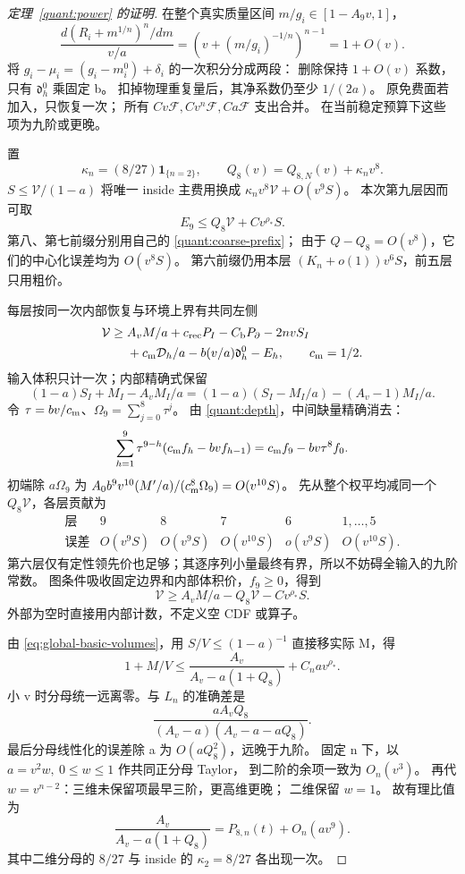 \begin{proof}[定理~\ref{quant:power} 的证明]
在整个真实质量区间 \(m/g_i\in[1-A_9v,1]\)，
\[
 \frac{d(R_i+m^{1/n})^n/dm}{v/a}
              =(v+(m/g_i)^{-1/n})^{n-1}=1+O(v).
\]
将 \(g_i-\mu_i=(g_i-m_i^0)+\delta_i\) 的一次积分分成两段：
删除保持 \(1+O(v)\) 系数，只有 \(\mathfrak d_h^0\) 乘固定 b。
扣掉物理重复量后，其净系数仍至少 \(1/(2a)\)。
原免费面若加入，只恢复一次；
所有 \(Cv\mathcal F,Cv^n\mathcal F,Ca\mathcal F\) 支出合并。
在当前稳定预算下这些项为九阶或更晚。

置
\[
 \kappa_n=(8/27)\mathbf1_{\{n=2\}},\qquad
 Q_8(v)=Q_{8,N}(v)+\kappa_nv^8.
\]
\(S\le\mathcal V/(1-a)\) 将唯一 inside 主费用换成
\(\kappa_nv^8\mathcal V+O(v^9S)\)。
本次第九层因而可取
\[
 E_9\le Q_8\mathcal V+Cv^{\rho_*}S.
\]
第八、第七前缀分别用自己的
\eqref{quant:coarse-prefix}；
由于 \(Q-Q_8=O(v^8)\)，它们的中心化误差均为 \(O(v^8S)\)。
第六前缀仍用本层 \((K_n+o(1))v^6S\)，前五层只用粗价。

每层按同一次内部恢复与环境上界有共同左侧
\[
 \begin{aligned}
 \mathcal V\ge{}&A_vM/a+c_{\rm rec}P_I-C_{\rm b}P_\partial-2nvS_I\\
 &+c_{\rm m}\mathcal D_h/a-b(v/a)\mathfrak d_h^0-E_h,
 \qquad c_{\rm m}=1/2 .
 \end{aligned}
\]
输入体积只计一次；内部精确式保留
\[
 (1-a)S_I+M_I-A_vM_I/a
 =(1-a)(S_I-M_I/a)-(A_v-1)M_I/a .
\]
令 \(\tau=bv/c_{\rm m}\)、\(\Omega_9=\sum_{j=0}^8\tau^j\)。
由 \eqref{quant:depth}，中间缺量精确消去：
\[
 \sum_{h=1}^9\tau^{9-h}(c_{\rm m}f_h-bvf_{h-1})
       =c_{\rm m}f_9-bv\tau^8f_0 .
\]
初端除 \(a\Omega_9\) 为
\(A_0b^9v^{10}(M'/a)/(c_{\rm m}^8\Omega_9)=O(v^{10}S)\)。
先从整个权平均减同一个 \(Q_8\mathcal V\)，各层贡献为
\[
 \begin{array}{c|ccccc}
  \text{层}&9&8&7&6&1,\ldots,5\\ \hline
  \text{误差}&O(v^9S)&O(v^9S)&O(v^{10}S)&o(v^9S)&O(v^{10}S).
 \end{array}
\]
第六层仅有定性领先价也足够；其逐序列小量最终有界，所以不妨碍全输入的九阶常数。
图条件吸收固定边界和内部体积价，\(f_9\ge0\)，得到
\[
 \mathcal V\ge A_vM/a-Q_8\mathcal V-Cv^{\rho_*}S.
\]
外部为空时直接用内部计数，不定义空 CDF 或算子。

由 \eqref{eq:global-basic-volumes}，用 \(S/V\le(1-a)^{-1}\) 直接移实际 M，得
\[
 1+M/V\le\frac{A_v}{A_v-a(1+Q_8)}+C_n av^{\rho_*}.
\]
小 v 时分母统一远离零。与 \(L_n\) 的准确差是
\[
 \frac{aA_vQ_8}{(A_v-a)(A_v-a-aQ_8)}.
\]
最后分母线性化的误差除 a 为 \(O(aQ_8^2)\)，远晚于九阶。
固定 n 下，以 \(a=v^2w,\ 0\le w\le1\) 作共同正分母 Taylor，
到二阶的余项一致为 \(O_n(v^3)\)。
再代 \(w=v^{n-2}\)：三维未保留项最早三阶，更高维更晚；
二维保留 \(w=1\)。
故有理比值为
\[
 \frac{A_v}{A_v-a(1+Q_8)}
 =P_{8,n}(t)+O_n(av^9).
\]
其中二维分母的 \(8/27\) 与 inside 的 \(\kappa_2=8/27\) 各出现一次。


\end{proof}
